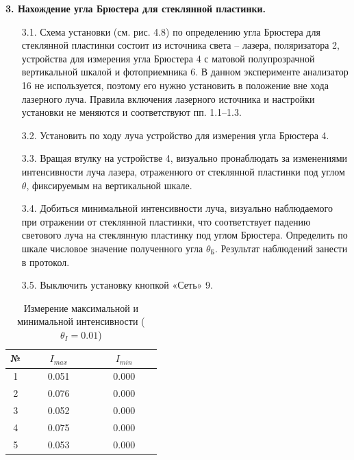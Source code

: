 \textbf{3. Нахождение угла Брюстера для стеклянной пластинки.}
\begin{enumerate}
    \item[3.1.] Схема установки (см. рис. 4.8) по определению угла Брюстера для стеклянной пластинки состоит из источника света -- лазера, поляризатора 2, устройства для измерения угла Брюстера 4 с матовой полупрозрачной вертикальной шкалой и фотоприемника 6. В данном эксперименте анализатор 16 не используется, поэтому его нужно установить в положение вне хода лазерного луча. Правила включения лазерного источника и настройки установки не меняются и соответствуют пп. 1.1--1.3.
    \item[3.2.] Установить по ходу луча устройство для измерения угла Брюстера 4.
    \item[3.3.] Вращая втулку на устройстве 4, визуально пронаблюдать за изменениями интенсивности луча лазера, отраженного от стеклянной пластинки под углом $\theta$, фиксируемым на вертикальной шкале.
    \item[3.4.] Добиться минимальной интенсивности луча, визуально наблюдаемого при отражении от стеклянной пластинки, что соответствует падению светового луча на стеклянную пластинку под углом Брюстера. Определить по шкале числовое значение полученного угла $\theta_Б$. Результат наблюдений занести в протокол.
    \item[3.5.] Выключить установку кнопкой «Сеть» 9.
\end{enumerate}




















\newpage
\thispagestyle{empty}

\begin{table}[H]
    \centering
    \caption{Измерение максимальной и минимальной интенсивности ($\theta_I=0.01$)}
    \label{tab:polarization}
    \begin{tabular}{|c|c|c|}
        \hline
            № & $\qquad I_{max} \qquad$ & $\qquad I_{min} \qquad$   \\
        \hline
            1 & 0.051 & 0.000 \\
        \hline
            2 & 0.076 & 0.000 \\
        \hline
            3 & 0.052 & 0.000 \\
        \hline
            4 & 0.075 & 0.000 \\
        \hline
            5 & 0.053 & 0.000 \\
        \hline
    \end{tabular}
\end{table}

